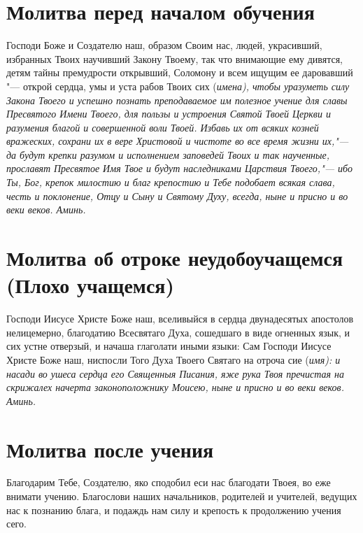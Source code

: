 \section{Молитва перед началом обучения}\begin{mymulticols}



Господи Боже и Создателю наш, образом Своим нас, людей, украсивший, избранных Твоих научивший Закону Твоему, так что внимающие ему дивятся, детям тайны премудрости открывший, Соломону и всем ищущим ее даровавший "--- открой сердца, умы и уста рабов Твоих сих (\itshape имена\normalfont{}), чтобы уразуметь силу Закона Твоего и успешно познать преподаваемое им полезное учение для славы Пресвятого Имени Твоего, для пользы и устроения Святой Твоей Церкви и разумения благой и совершенной воли Твоей. Избавь их от всяких козней вражеских, сохрани их в вере Христовой и чистоте во все время жизни их,"--- да будут крепки разумом и исполнением заповедей Твоих и так наученные, прославят Пресвятое Имя Твое и будут наследниками Царствия Твоего,"--- ибо Ты, Бог, крепок милостию и благ крепостию и Тебе подобает всякая слава, честь и поклонение, Отцу и Сыну и Святому Духу, всегда, ныне и присно и во веки веков. Аминь.


\end{mymulticols}

\section{Молитва об отроке неудобоучащемся (Плохо учащемся)}\begin{mymulticols}

Господи Иисусе Христе Боже наш, вселивыйся в сердца двунадесятых апостолов нелицемерно, благодатию Всесвятаго Духа, сошедшаго в виде огненных язык, и сих устне отверзый, и начаша глаголати иными языки: Сам Господи Иисусе Христе Боже наш, ниспосли Того Духа Твоего Святаго на отроча сие (\itshape имя\normalfont{}): и насади во ушеса сердца его Священныя Писания, яже рука Твоя пречистая на скрижалех начерта законоположнику Моисею, ныне и присно и во веки веков. Аминь.

\end{mymulticols}

\section{Молитва после учения}\begin{mymulticols}



Благодарим Тебе, Создателю, яко сподобил еси нас благодати Твоея, во еже внимати учению. Благослови наших начальников, родителей и учителей, ведущих нас к познанию блага, и подаждь нам силу и крепость к продолжению учения сего.

\end{mymulticols}

